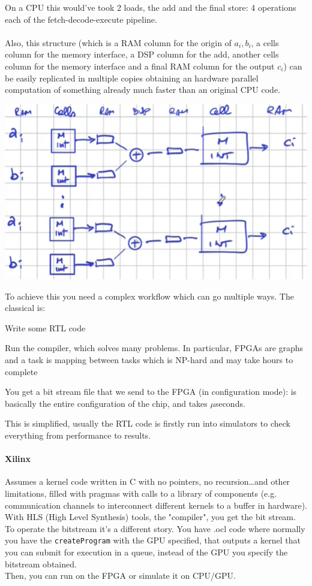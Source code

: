 \documentclass[10pt]{report}
\begin{document}
On a CPU this would've took 2 loads, the add and the final store: 4 operations each of the fetch-decode-execute pipeline.\\\\
Also, this structure (which is a RAM column for the origin of $a_i,b_i$, a cells column for the memory interface, a DSP column for the add, another cells column for the memory interface and a final RAM column for the output $c_i$) can be easily replicated in multiple copies obtaining an hardware parallel computation of something already much faster than an original CPU code.
\begin{center}
	\includegraphics[scale=0.5]{25.png}
\end{center}
To achieve this you need a complex workflow which can go multiple ways. The classical is:
\begin{list}{}{}
	\item Write some RTL code
	\item Run the compiler, which solves many problems. In particular, FPGAs are graphs and a task is mapping between tasks which is NP-hard and may take hours to complete
	\item You get a bit stream file that we send to the FPGA (in configuration mode): is basically the entire configuration of the chip, and takes $\mu$seconds.
\end{list}
This is simplified, usually the RTL code is firstly run into simulators to check everything from performance to results.
\paragraph{Xilinx} Assumes a kernel code written in C with no pointers, no recursion\ldots and other limitations, filled with pragmas with calls to a library of components (e.g. communication channels to interconnect different kernels to a buffer in hardware). With HLS (High Level Synthesis) tools, the "compiler", you get the bit stream.\\
To operate the bitstream it's a different story. You have .ocl code where normally you have the \texttt{createProgram} with the GPU specified, that outputs a kernel that you can submit for execution in a queue, instead of the GPU you specify the bitstream obtained.\\
Then, you can run on the FPGA or simulate it on CPU/GPU.
\end{document}
